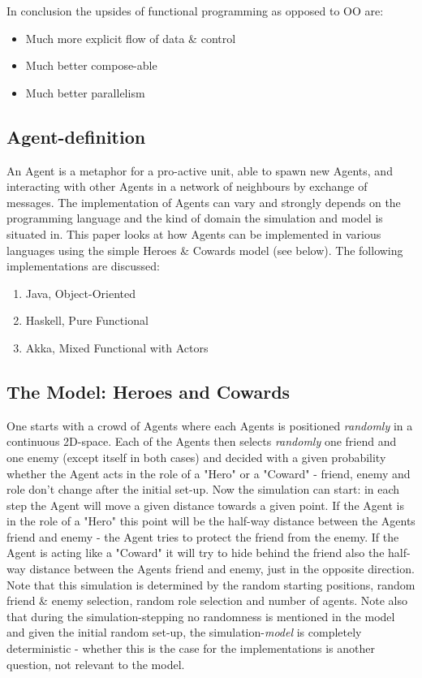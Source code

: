 In conclusion the upsides of functional programming as opposed to OO are:
\begin{itemize}
\item Much more explicit flow of data \& control
\item Much better compose-able
\item Much better parallelism
\end{itemize}


\subsection{Agent-definition}
An Agent is a metaphor for a pro-active unit, able to spawn new Agents, and interacting with other Agents in a network of neighbours by exchange of messages. The implementation of Agents can vary and strongly depends on the programming language and the kind of domain the simulation and model is situated in. This paper looks at how Agents can be implemented in various languages using the simple Heroes \& Cowards model (see below). The following implementations are discussed:

\begin{enumerate}
\item Java, Object-Oriented
\item Haskell, Pure Functional
\item Akka, Mixed Functional with Actors
\end{enumerate}

\subsection{The Model: Heroes and Cowards}
One starts with a crowd of Agents where each Agents is positioned \textit{randomly} in a continuous 2D-space. Each of the Agents then selects \textit{randomly} one friend and one enemy (except itself in both cases) and decided with a given probability whether the Agent acts in the role of a "Hero" or a "Coward" - friend, enemy and role don't change after the initial set-up. Now the simulation can start: in each step the Agent will move a given distance towards a given point. If the Agent is in the role of a "Hero" this point will be the half-way distance between the Agents friend and enemy - the Agent tries to protect the friend from the enemy. If the Agent is acting like a "Coward" it will try to hide behind the friend also the half-way distance between the Agents friend and enemy, just in the opposite direction. \\
Note that this simulation is determined by the random starting positions, random friend \& enemy selection, random role selection and number of agents. Note also that during the simulation-stepping no randomness is mentioned in the model and given the initial random set-up, the simulation-\textit{model} is completely deterministic - whether this is the case for the implementations is another question, not relevant to the model.

